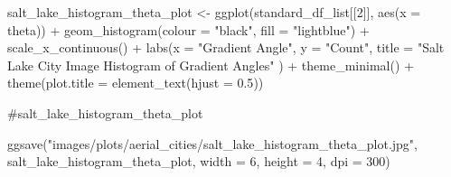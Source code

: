 \documentclass[
  letterpaper,
  DIV=11,
  numbers=noendperiod]{scrreprt}
\newenvironment{Shaded}{\begin{snugshade}}{\end{snugshade}}
\newcommand{\AttributeTok}[1]{\textcolor[rgb]{0.40,0.45,0.13}{#1}}
\newcommand{\CommentTok}[1]{\textcolor[rgb]{0.37,0.37,0.37}{#1}}
\newcommand{\DecValTok}[1]{\textcolor[rgb]{0.68,0.00,0.00}{#1}}
\newcommand{\FloatTok}[1]{\textcolor[rgb]{0.68,0.00,0.00}{#1}}
\newcommand{\FunctionTok}[1]{\textcolor[rgb]{0.28,0.35,0.67}{#1}}
\newcommand{\NormalTok}[1]{\textcolor[rgb]{0.00,0.23,0.31}{#1}}
\newcommand{\OtherTok}[1]{\textcolor[rgb]{0.00,0.23,0.31}{#1}}
\newcommand{\SpecialCharTok}[1]{\textcolor[rgb]{0.37,0.37,0.37}{#1}}
\newcommand{\StringTok}[1]{\textcolor[rgb]{0.13,0.47,0.30}{#1}}
\begin{document}
\begin{Shaded}
\begin{Highlighting}[]
\NormalTok{salt\_lake\_histogram\_theta\_plot }\OtherTok{\textless{}{-}}
  \FunctionTok{ggplot}\NormalTok{(standard\_df\_list[[}\DecValTok{2}\NormalTok{]], }
         \FunctionTok{aes}\NormalTok{(}\AttributeTok{x =}\NormalTok{ theta)) }\SpecialCharTok{+}
  \FunctionTok{geom\_histogram}\NormalTok{(}\AttributeTok{colour =} \StringTok{"black"}\NormalTok{, }\AttributeTok{fill =} \StringTok{"lightblue"}\NormalTok{) }\SpecialCharTok{+}
  \FunctionTok{scale\_x\_continuous}\NormalTok{() }\SpecialCharTok{+} 
  \FunctionTok{labs}\NormalTok{(}\AttributeTok{x =} \StringTok{"Gradient Angle"}\NormalTok{, }
       \AttributeTok{y =} \StringTok{"Count"}\NormalTok{, }
       \AttributeTok{title =} \StringTok{"Salt Lake City Image Histogram of Gradient Angles"}
\NormalTok{       ) }\SpecialCharTok{+}
  \FunctionTok{theme\_minimal}\NormalTok{() }\SpecialCharTok{+}
  \FunctionTok{theme}\NormalTok{(}\AttributeTok{plot.title =} \FunctionTok{element\_text}\NormalTok{(}\AttributeTok{hjust =} \FloatTok{0.5}\NormalTok{))}

\CommentTok{\#salt\_lake\_histogram\_theta\_plot}

\FunctionTok{ggsave}\NormalTok{(}\StringTok{"images/plots/aerial\_cities/salt\_lake\_histogram\_theta\_plot.jpg"}\NormalTok{, salt\_lake\_histogram\_theta\_plot, }\AttributeTok{width =} \DecValTok{6}\NormalTok{, }\AttributeTok{height =} \DecValTok{4}\NormalTok{, }\AttributeTok{dpi =} \DecValTok{300}\NormalTok{)}
\end{Highlighting}
\end{Shaded}
\end{document}
